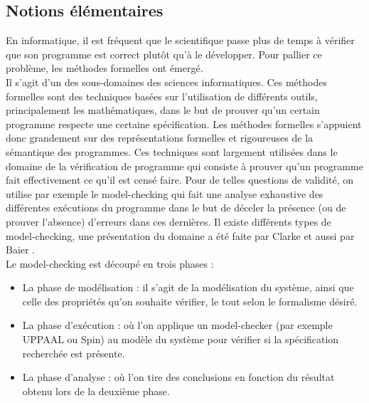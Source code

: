\documentclass[11pt,a4paper,oneside]{book}
\theoremstyle{break}
\theoremstyle{breakplain}
\begin{document}
\subsection{Notions élémentaires}
En informatique, il est fréquent que le scientifique passe plus de temps à vérifier que son programme est correct plutôt qu'à le développer. Pour pallier ce problème, les méthodes formelles ont émergé.\\
Il s'agit d'un des sous-domaines des sciences informatiques. Ces méthodes formelles sont des techniques basées sur l'utilisation de différents outils, principalement les mathématiques, dans le but de prouver qu'un certain programme respecte une certaine spécification. Les méthodes formelles s'appuient donc grandement sur des représentations formelles et rigoureuses de la sémantique des programmes. Ces techniques sont largement utilisées dans le domaine de la vérification de programme qui consiste à prouver qu'un programme fait effectivement ce qu'il est censé faire. Pour de telles questions de validité, on utilise par exemple le model-checking qui fait une analyse exhaustive des différentes exécutions du programme dans le but de déceler la présence (ou de prouver l'absence) d'erreurs dans ces dernières. Il existe différents types de model-checking, une présentation du domaine a été faite par Clarke \cite{clarke1999model} et aussi par Baier \cite{baier2008principles}.\\

Le model-checking est découpé en trois phases :
\begin{itemize}
\item La phase de modélisation : il s'agit de la modélisation du système, ainsi que celle des propriétés qu'on souhaite vérifier, le tout selon le formalisme désiré.
\item La phase d'exécution : où l'on applique un model-checker (par exemple UPPAAL ou Spin) au modèle du système pour vérifier si la spécification recherchée est présente.
\item La phase d'analyse : où l'on tire des conclusions en fonction du résultat obtenu lors de la deuxième phase.
\end{itemize}
\phantom\\
\end{document}

